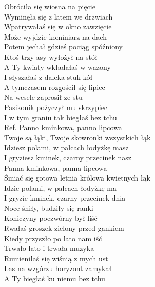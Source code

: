 
Obróciła się wiosna na pięcie \tab{}\\
Wyminęła się z latem we drzwiach \\
Wpatrywałaś się w okno zawzięcie \\
Może wyjdzie kominiarz na dach \\
Potem jechał gdzieś pociąg spóźniony \\
Ktoś trzy asy wyłożył na stół \tab{}\\
A Ty kwiaty wkładałaś w wazony \\
I słyszałaś z daleka stuk kół \tab{}\\
\hops
A tymczasem rozgościł się lipiec  \\
Na wesele zaprosił ze stu  \tab{}\\
Pasikonik pożyczył mu skrzypiec  \\
I w tym graniu tak biegłaś bez tchu  \\
\hops
Ref. Panno kminkowa, panno lipcowa \tab{}\\
 Twoje są łąki, Twoje skowronki wszystkich łąk \\
 Idziesz polami, w palcach łodyżkę masz \tab{}\\
 I gryziesz kminek, czarny przecinek nasz \tab{}\\
\hops
{} Panna kminkowa, panna lipcowa \\
 Śmiać się gotowa letnia królowa kwietnych łąk \\
 Idzie polami, w palcach łodyżkę ma \\
 I gryzie kminek, czarny przecinek dnia \\
\hops
Noce śniły, budziły się ranki \\
Koniczyny poczwórny był liść \\
Rwałaś groszek zielony przed gankiem \\
Kiedy przyszło po lato nam iść \\
Trwało lato i trwała muzyka \\
Rumieniłaś się wiśnią z mych ust \\
Las na wzgórzu horyzont zamykał \\
A Ty biegłaś ku niemu bez tchu \\
